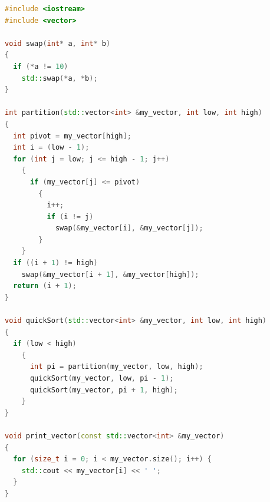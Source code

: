 \begin{lstlisting}[language=C++, caption={quickSort, partition and swap implementations}, frame=p, label={lst:quicksortFunctions}]
#include <iostream>
#include <vector>

void swap(int* a, int* b)
{
  if (*a != 10)
    std::swap(*a, *b);
}

int partition(std::vector<int> &my_vector, int low, int high)
{
  int pivot = my_vector[high];
  int i = (low - 1);
  for (int j = low; j <= high - 1; j++)
    {
      if (my_vector[j] <= pivot)
        {
          i++;
          if (i != j)
            swap(&my_vector[i], &my_vector[j]);
        }
    }
  if ((i + 1) != high)
    swap(&my_vector[i + 1], &my_vector[high]);
  return (i + 1);
}

void quickSort(std::vector<int> &my_vector, int low, int high)
{
  if (low < high)
    {
      int pi = partition(my_vector, low, high);
      quickSort(my_vector, low, pi - 1);
      quickSort(my_vector, pi + 1, high);
    }
}

void print_vector(const std::vector<int> &my_vector)
{
  for (size_t i = 0; i < my_vector.size(); i++) {
    std::cout << my_vector[i] << ' ';
  }
}
\end{lstlisting}

